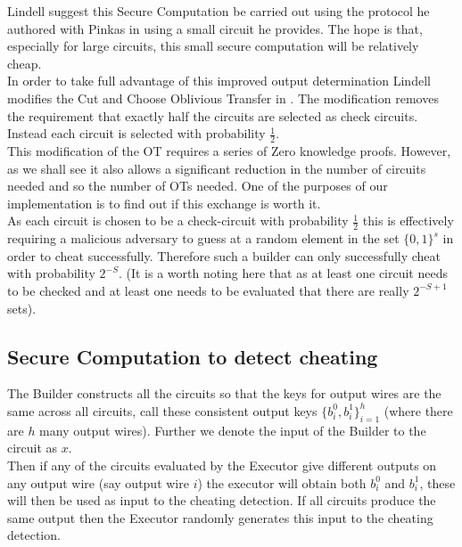 \documentclass[ %
                    author={Nicholas Tutte},
                supervisor={Prof. Nigel Smart},
                    degree={MEng},
                     title={Secure Two Party Computation},
                  subtitle={A practical comparison of recent protocols},
                      type={Research - GG1K},
                      year={2015} ]{dissertation}
\begin{document}
				Lindell suggest this Secure Computation be carried out using the protocol he authored with Pinkas in \cite{LindellAndPinkas2011} using a small circuit he provides. The hope is that, especially for large circuits, this small secure computation will be relatively cheap.\\

				In order to take full advantage of this improved output determination Lindell modifies the Cut and Choose Oblivious Transfer in \cite{LindellAndPinkas2011}. The modification removes the requirement that exactly half the circuits are selected as check circuits. Instead each circuit is selected with probability $\frac{1}{2}$.\\

				This modification of the OT requires a series of Zero knowledge proofs. However, as we shall see it also allows a significant reduction in the number of circuits needed and so the number of OTs needed. One of the purposes of our implementation is to find out if this exchange is worth it.\\

				As each circuit is chosen to be a check-circuit with probability $\frac{1}{2}$ this is effectively requiring a malicious adversary to guess at a random element in the set $\{0, 1\}^s$ in order to cheat successfully. Therefore such a builder can only successfully cheat with probability $2^{-S}$. (It is a worth noting here that as at least one circuit needs to be checked and at least one needs to be evaluated that there are really $2^{-S+1}$ sets).

			\subsection{Secure Computation to detect cheating}
				The Builder constructs all the circuits so that the keys for output wires are the same across all circuits, call these consistent output keys $\{b_i^0, b_i^1\}_{i = 1}^{h}$ (where there are $h$ many output wires). Further we denote the input of the Builder to the circuit as $x$.\\

				Then if any of the circuits evaluated by the Executor give different outputs on any output wire (say output wire $i$) the executor will obtain both $b_i^0$ and $b_i^1$, these will then be used as input to the cheating detection. If all circuits produce the same output then the Executor randomly generates this input to the cheating detection.\\
					
\end{document}
